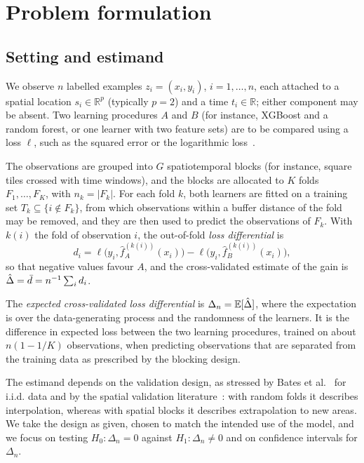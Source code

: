 \section{Problem formulation}\label{sec:problem}

\subsection{Setting and estimand}

We observe $n$ labelled examples $z_i=(x_i,y_i)$, $i=1,\dots,n$, each attached to a spatial location $s_i\in\mathbb{R}^p$ (typically $p=2$) and a time $t_i\in\mathbb{R}$; either component may be absent. Two learning procedures $A$ and $B$ (for instance, XGBoost and a random forest, or one learner with two feature sets) are to be compared using a loss $\ell$, such as the squared error or the logarithmic loss~\cite{gneiting2007}.

The observations are grouped into $G$ spatiotemporal blocks (for instance, square tiles crossed with time windows), and the blocks are allocated to $K$ folds $F_1,\dots,F_K$, with $n_k=|F_k|$. For each fold $k$, both learners are fitted on a training set $T_k\subseteq\{i\notin F_k\}$, from which observations within a buffer distance of the fold may be removed, and they are then used to predict the observations of $F_k$. With $k(i)$ the fold of observation $i$, the out-of-fold \emph{loss differential} is
\begin{equation}\label{eq:d}
d_i=\ell\bigl(y_i,\hat f_A^{(k(i))}(x_i)\bigr)-\ell\bigl(y_i,\hat f_B^{(k(i))}(x_i)\bigr),
\end{equation}
so that negative values favour $A$, and the cross-validated estimate of the gain is $\hat\Delta=\bar d=n^{-1}\sum_i d_i$.

\begin{definition}[Estimand]
The \emph{expected cross-validated loss differential} is $\Delta_n=\mathbb{E}[\hat\Delta]$, where the expectation is over the data-generating process and the randomness of the learners. It is the difference in expected loss between the two learning procedures, trained on about $n(1-1/K)$ observations, when predicting observations that are separated from the training data as prescribed by the blocking design.
\end{definition}

The estimand depends on the validation design, as stressed by Bates et al.~\cite{bates2024} for i.i.d. data and by the spatial validation literature~\cite{roberts2017,wadoux2021}: with random folds it describes interpolation, whereas with spatial blocks it describes extrapolation to new areas. We take the design as given, chosen to match the intended use of the model, and we focus on testing $H_0:\Delta_n=0$ against $H_1:\Delta_n\neq0$ and on confidence intervals for $\Delta_n$.

